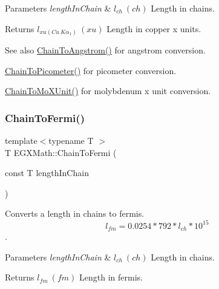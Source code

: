 \begin{DoxyParams}{Parameters}
{\em length\+In\+Chain} & $ l_{ch}\ (ch)$ Length in chains. \\
\hline
\end{DoxyParams}
\begin{DoxyReturn}{Returns}
$ l_{xu(Cu\ K\alpha_1)}\ (xu)$ Length in copper x units. 
\end{DoxyReturn}
\begin{DoxySeeAlso}{See also}
\mbox{\hyperlink{group___e_g_x_math-_conversions-_length_conversions-_surveyors-_chain-_non-_s_i_ga89e870762310908510aad80d26dc1942}{Chain\+To\+Angstrom()}} for angstrom conversion. 

\mbox{\hyperlink{group___e_g_x_math-_conversions-_length_conversions-_surveyors-_chain-_s_i_ga27f06f3f63727a16e02afaf8f01f4b45}{Chain\+To\+Picometer()}} for picometer conversion. 

\mbox{\hyperlink{group___e_g_x_math-_conversions-_length_conversions-_surveyors-_chain-_non-_s_i_gae4a2b99d846db53416e9fc5d6f9e957c}{Chain\+To\+Mo\+X\+Unit()}} for molybdenum x unit conversion. 
\end{DoxySeeAlso}
\mbox{\label{group___e_g_x_math-_conversions-_length_conversions-_surveyors-_chain-_non-_s_i_ga88b0e20b062ca36346a6daeb5052c40a}} 
\subsubsection{\texorpdfstring{Chain\+To\+Fermi()}{ChainToFermi()}}
{\footnotesize\ttfamily template$<$typename T $>$ \\
T E\+G\+X\+Math\+::\+Chain\+To\+Fermi (\begin{DoxyParamCaption}\item[{const T}]{length\+In\+Chain }\end{DoxyParamCaption})}



Converts a length in chains to fermis. \[ l_{fm}=0.0254 * 792 * l_{ch} * 10^{15} \]. 


\begin{DoxyParams}{Parameters}
{\em length\+In\+Chain} & $ l_{ch}\ (ch)$ Length in chains. \\
\hline
\end{DoxyParams}
\begin{DoxyReturn}{Returns}
$ l_{fm}\ (fm)$ Length in fermis. 
\end{DoxyReturn}
\mbox{\label{group___e_g_x_math-_conversions-_length_conversions-_surveyors-_chain-_non-_s_i_ga9efe9ceb0ab30639026cbb4158bb0148}} 
